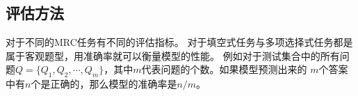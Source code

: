 
\subsection{评估方法}
对于不同的MRC任务有不同的评估指标。
对于填空式任务与多项选择式任务都是属于客观题型，用准确率就可以衡量模型的性能。
例如对于测试集合中的所有问题$Q=\{Q_1,$$Q_2,\cdots,Q_m\}$，其中$m$代表问题的个数。如果模型预测出来的
$m$个答案中有$n$个是正确的，那么模型的准确率是$n/m$。

